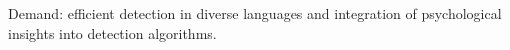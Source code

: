 Demand: efficient detection in diverse languages and integration of psychological insights into detection algorithms.